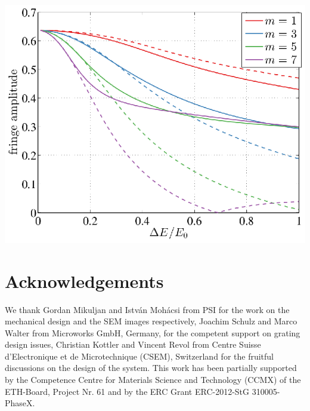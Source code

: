 \documentclass[a0,portrait]{a0poster}
\begin{document}
\begin{multicols}{2}
\begin{center}
    \includegraphics[width=0.5\linewidth]{polychromatic.eps}
\end{center}

\section*{Acknowledgements}
We thank Gordan Mikuljan and István Mohácsi from PSI for the
work on the mechanical design and the SEM images
respectively, Joachim Schulz and Marco Walter from
Microworks GmbH, Germany, for the competent support on grating design
issues, Christian Kottler and Vincent Revol from Centre Suisse
d'Electronique et de Microtechnique (CSEM), Switzerland for the fruitful
discussions on the design of the system. This work has been partially
supported by the Competence Centre for Materials Science and Technology
(CCMX) of the ETH-Board, Project Nr. 61 and by the ERC Grant ERC-2012-StG 310005-PhaseX.


\end{multicols}
\end{document}
